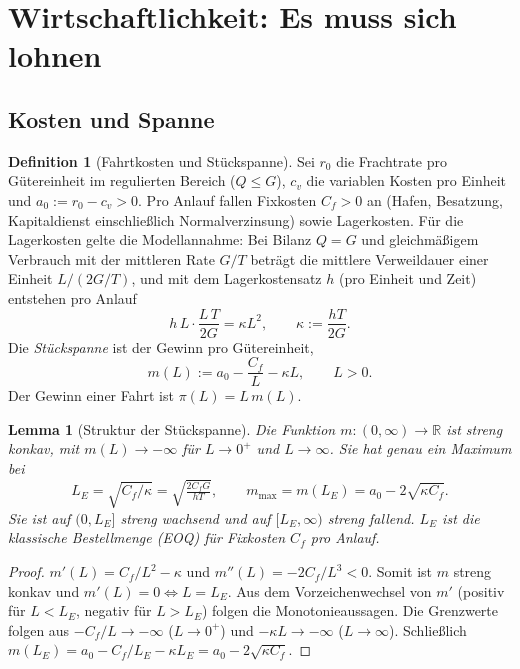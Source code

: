 \documentclass[a4paper, 12pt, twoside, openright]{report}
\newtheorem{lemma}[theorem]{Lemma}
\theoremstyle{definition}
\newtheorem{definition}[theorem]{Definition}
\theoremstyle{definition}
\newcommand{\R}{\mathbb{R}}
\begin{document}
\section{Wirtschaftlichkeit: Es muss sich lohnen}\label{sec:sf-oeko}

\subsection{Kosten und Spanne}

\begin{definition}[Fahrtkosten und Stückspanne]\label{def:sf-kosten}
Sei $r_0$ die Frachtrate pro Gütereinheit im regulierten Bereich ($Q\le G$),
$c_v$ die variablen Kosten pro Einheit und $a_0:=r_0-c_v>0$. Pro Anlauf fallen
Fixkosten $C_f>0$ an (Hafen, Besatzung, Kapitaldienst einschließlich
Normalverzinsung) sowie Lagerkosten. Für die Lagerkosten gelte die
Modellannahme: Bei Bilanz $Q=G$ und gleichmäßigem Verbrauch mit der mittleren Rate
$G/T$ beträgt die mittlere Verweildauer einer Einheit $L/(2G/T)$, und mit dem
Lagerkostensatz $h$ (pro Einheit und Zeit) entstehen pro Anlauf
\[
  h\,L\cdot\frac{L\,T}{2G}=\kappa L^{2},\qquad \kappa:=\frac{hT}{2G}.
\]
Die \emph{Stückspanne} ist der Gewinn pro Gütereinheit,
\begin{equation}
  m(L):=a_0-\frac{C_f}{L}-\kappa L,\qquad L>0 .
  \label{eq:sf-m}
\end{equation}
Der Gewinn einer Fahrt ist $\pi(L)=L\,m(L)$.
\end{definition}

\begin{lemma}[Struktur der Stückspanne]\label{lem:sf-m}
Die Funktion $m:(0,\infty)\to\R$ ist streng konkav, mit $m(L)\to-\infty$ für
$L\to0^+$ und $L\to\infty$. Sie hat genau ein Maximum bei
\begin{equation}
  L_E=\sqrt{C_f/\kappa}=\sqrt{\tfrac{2C_fG}{hT}},\qquad
  m_{\max}=m(L_E)=a_0-2\sqrt{\kappa C_f}.
  \label{eq:sf-LE}
\end{equation}
Sie ist auf $(0,L_E]$ streng wachsend und auf $[L_E,\infty)$ streng fallend. $L_E$
ist die klassische Bestellmenge (EOQ) für Fixkosten $C_f$ pro Anlauf.
\end{lemma}

\begin{proof}
$m'(L)=C_f/L^2-\kappa$ und $m''(L)=-2C_f/L^3<0$. Somit ist $m$ streng konkav und
$m'(L)=0\iff L=L_E$. Aus dem Vorzeichenwechsel von $m'$ (positiv für $L<L_E$,
negativ für $L>L_E$) folgen die Monotonieaussagen. Die Grenzwerte folgen aus
$-C_f/L\to-\infty$ ($L\to0^+$) und $-\kappa L\to-\infty$ ($L\to\infty$). Schließlich
$m(L_E)=a_0-C_f/L_E-\kappa L_E=a_0-2\sqrt{\kappa C_f}$.
\end{proof}
\end{document}
